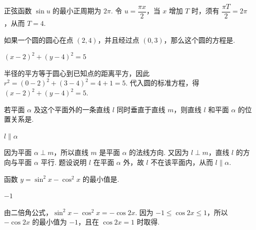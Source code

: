 \begin{solution}
正弦函数 \(\sin u\) 的最小正周期为 \(2\pi\). 令 \(u=\dfrac{\pi x}{2}\)，当 \(x\) 增加 \(T\) 时，须有 \(\dfrac{\pi T}{2}=2\pi\)，从而 \(T=4\).
\end{solution}

\begin{problem}

如果一个圆的圆心在点 \((2,4)\)，并且经过点 \((0,3)\)，那么这个圆的方程是\fillinblank{}.

\begin{answer}
\(\left(x-2\right)^2+\left(y-4\right)^2=5\)
\end{answer}
\end{problem}

\begin{solution}
半径的平方等于圆心到已知点的距离平方，因此
\(r^2=\left(0-2\right)^2+\left(3-4\right)^2=4+1=5\). 代入圆的标准方程，得 \(\left(x-2\right)^2+\left(y-4\right)^2=5\).
\end{solution}

\begin{problem}

若平面 \(\alpha\) 及这个平面外的一条直线 \(l\) 同时垂直于直线 \(m\)，则直线 \(l\) 和平面 \(\alpha\) 的位置关系是\fillinblank{}.

\begin{answer}
\(l\parallel\alpha\)
\end{answer}
\end{problem}

\begin{solution}
因为平面 \(\alpha\perp m\)，所以直线 \(m\) 是平面 \(\alpha\) 的法线方向. 又因为 \(l\perp m\)，直线 \(l\) 的方向与平面 \(\alpha\) 平行. 题设说明 \(l\) 在平面 \(\alpha\) 外，故 \(l\) 不在该平面内，从而 \(l\parallel\alpha\).
\end{solution}

\begin{problem}

函数 \(y=\sin^{2}x-\cos^{2}x\) 的最小值是\fillinblank{}.

\begin{answer}
\(-1\)
\end{answer}
\end{problem}

\begin{solution}
由二倍角公式，\(\sin^{2}x-\cos^{2}x=-\cos 2x\). 因为 \(-1\leqslant\cos 2x\leqslant1\)，所以 \(-\cos 2x\) 的最小值为 \(-1\)，且在 \(\cos 2x=1\) 时取得.
\end{solution}

